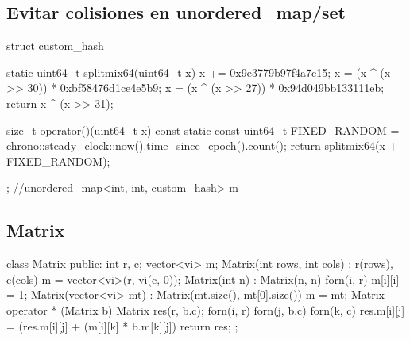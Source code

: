 \subsection{Evitar colisiones en unordered\_map/set}
\begin{code}
struct custom_hash {
    static uint64_t splitmix64(uint64_t x) {
        x += 0x9e3779b97f4a7c15;
        x = (x ^ (x >> 30)) * 0xbf58476d1ce4e5b9;
        x = (x ^ (x >> 27)) * 0x94d049bb133111eb;
        return x ^ (x >> 31);
    }
 
    size_t operator()(uint64_t x) const {
        static const uint64_t FIXED_RANDOM = chrono::steady_clock::now().time_since_epoch().count();
        return splitmix64(x + FIXED_RANDOM);
    }
};
//unordered_map<int, int, custom_hash> m
\end{code}
\subsection{Matrix}
\begin{code}
class Matrix{
public:
    int r, c;
    vector<vi> m;
    Matrix(int rows, int cols) : r(rows), c(cols){
        m = vector<vi>(r, vi(c, 0));
    }
    Matrix(int n) : Matrix(n, n){
        forn(i, r) m[i][i] = 1; 
    }
    Matrix(vector<vi> mt) : Matrix(mt.size(), mt[0].size()) {
        m = mt;
    }
    Matrix operator * (Matrix b) {
        Matrix res(r, b.c);
        forn(i, r) {
            forn(j, b.c) {
                forn(k, c) {
                    res.m[i][j] = (res.m[i][j] + (m[i][k] * b.m[k][j])%
                }
            }
        }
        return res;
    }
};
\end{code}

